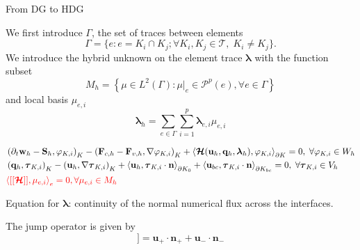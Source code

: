 \documentclass[24pt,t,table, aspectratio=169]{beamer}
\newcommand{\vecu}{\mathbf{u}}
\newcommand{\vecF}{\mathbf{F}}
\newcommand{\vecS}{\mathbf{S}}
\newcommand{\vecq}{\mathbf{q}}
\newcommand{\vecw}{\mathbf{w}}
\newcommand{\vectau}{\boldsymbol{\tau}}
\newcommand{\vecHcal}{\boldsymbol{\mathcal{H}}}
\newcommand{\veclambda}{\boldsymbol{\lambda}}
\newcommand{\tesselation}{\mathcal{T}}
\newcommand{\vecn}{\mathbf{n}}
\begin{document}
\begin{frame}{From DG to HDG}
{We first introduce $\Gamma$, the set of traces between elements
\begin{equation}
    \Gamma = \{e:e = K_i \cap K_j; \forall K_i, K_j \in \tesselation,\; K_i \neq K_j\}.
\end{equation}
We introduce the hybrid unknown on the element trace $\veclambda$ with the function subset
\begin{equation*}
M_h = \left\{\mu \in L^2(\Gamma) : \mu|_e \in \mathcal{P}^p(e), \forall e\in \Gamma\right\}
\end{equation*}
and local basis $\mu_{e,i}$
\begin{equation*}
\veclambda_h = \sum_{e\in\Gamma}\sum_{i=1}^{p} \veclambda_{e,i} \mu_{e,i}
\end{equation*}

}

{
\begin{equation*}
\begin{aligned}
& \left(\partial_t \vecw_{h} - \vecS_{h}, \varphi_{K,i} \right)_{K} - \left(\vecF_{c, {h}} - \vecF_{v, {h}}, \nabla \varphi_{K,i} \right)_{K} + \left\langle \vecHcal(\vecu_h, \vecq_h, \veclambda_h), \varphi_{K,i} \right\rangle_{\partial K} = 0, \; \forall \varphi_{K,i} \in W_h\\
& \left(\vecq_h, \vectau_{K,i}\right)_{K} - \left(\vecu_h, \nabla \vectau_{K,i}\right)_{K} + \left\langle \vecu_h, \vectau_{K,i} \cdot \vecn \right\rangle_{\partial K_0} + \left\langle \vecu_{bc}, \vectau_{K,i} \cdot \vecn \right\rangle_{\partial K_{bc}} = 0,\; \forall \vectau_{K,i} \in V_h\\
& \textcolor{red}{\left\langle[[\vecHcal]], \mu_{e,i} \right\rangle_{e} = 0, \forall \mu_{e,i} \in M_h}
\end{aligned}
\end{equation*}

Equation for $\veclambda$: continuity of the normal numerical flux across the interfaces.

The jump operator is given by
\begin{equation*}
[[\vecu]] = \vecu_+ \cdot \vecn_+ + \vecu_- \cdot \vecn_-
\end{equation*}

}


\end{frame}
\end{document}

